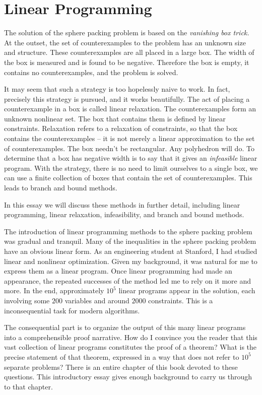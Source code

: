 \clearpage
\section{Linear Programming}

The solution of the sphere packing problem is based on the {\it vanishing
box trick.}  At the outset, the set of 
counterexamples to the problem has an unknown size and structure.
These counterexamples are all placed in a large box.   
The width of the box is measured and is found to be negative.
Therefore the box is empty, it contains no counterexamples, and
the problem is solved.

It may seem that such a strategy is too hopelessly naive to work.
In fact, precisely this strategy is pursued, and it works beautifully.
The act of placing a counterexample in a box is called linear 
relaxation.  The counterexamples form an unknown nonlinear set.
The box that contains them is defined by linear constraints.  
Relaxation refers to a relaxation of constraints, so that the
box contains the counterexamples -- it is not merely a linear
approximation to the set of counterexamples.  The box needn't be
rectangular.  Any polyhedron will do.  To determine that a box
has negative width is to say that it gives an {\it infeasible} linear
program.  With the strategy, there is no need to limit ourselves
to a single box, we can use a finite collection of boxes that
contain the set of counterexamples.  This leads to branch and bound
methods.


In this essay we will discuss these methods in further detail,
including linear programming, linear relaxation,  infeasibility,
and branch and bound methods.

The introduction of linear programming methods to the sphere packing
problem was gradual and tranquil.  
Many of the
inequalities in the sphere packing problem have an obvious linear form.
As an engineering student
at Stanford, I had studied
linear and nonlinear optimization.
Given my background, 
it was natural for me to express them as a linear program.  
Once linear programming had made an appearance, the 
repeated successes of the method led me to rely on it more and more.
In the end, approximately $10^5$ linear programs appear in the solution,
each involving some $200$ variables and around $2000$ constraints.
This is a inconsequential task for modern algorithms.  

The consequential
part is to organize the output of this many 
linear programs into a comprehensible proof narrative.  How do I convince
you the reader that this vast collection of linear programs 
constitutes the proof of a theorem?  
What is the precise statement
of that theorem, expressed in a way that does not refer to $10^5$ separate
problems? There is an entire chapter of this book devoted to these questions.
This introductory essay gives enough background to carry us through
to that chapter.


